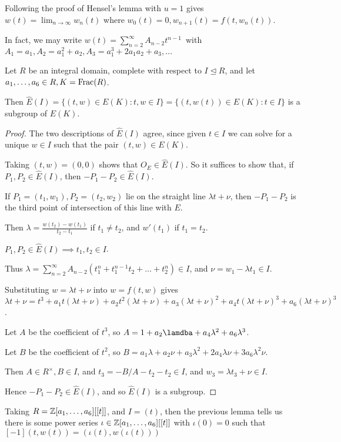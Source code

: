 \documentclass[10pt,a4paper]{article}
\begin{document}
Following the proof of Hensel's lemma with $u = 1$ gives $w(t) = \lim_{n\to \infty} w_n(t)$ where $w_0(t) = 0, w_{n+1}(t)=f(t, w_n(t))$.

In fact, we may write \mbox{$w(t) = \sum_{n=2}^\infty A_{n-2}t^{n-1}$ with $A_1 = a_1, A_2 = a_1^2+a_2, A_3 = a_1^3+2a_1a_2+a_3, \ldots$}

\begin{lemma}
  Let $R$ be an integral domain, complete with respect to $I \trianglelefteq R$, and let $a_1, \ldots, a_6 \in R, K = \operatorname{Frac}(R)$.

  Then $\hat{E}(I) = \{(t,w) \in E(K): t, w \in I\} = \{(t, w(t))\in E(K): t \in I\}$ is a subgroup of $E(K)$.
\end{lemma}
\begin{proof}
  The two descriptions of $\hat{E}(I)$ agree, since given $t \in I$ we can solve for a unique $w \in I$ such that the pair $(t,w)\in E(K)$.

  Taking $(t, w) = (0, 0)$ shows that $O_E \in \hat{E}(I)$. So it suffices to show that, if $P_1, P_2 \in \hat{E}(I)$, then $-P_1-P_2 \in \hat{E}(I)$.

  If $P_1 = (t_1,w_1), P_2 = (t_2,w_2)$ lie on the straight line $\lambda t + \nu$, then $-P_1-P_2$ is the third point of intersection of this line with $E$.

  Then $\lambda = \frac{w(t_2)-w(t_1)}{t_2-t_1}$ if $t_1 \neq t_2$, and $w'(t_1)$ if $t_1=t_2$.

  $P_1, P_2 \in \hat{E}(I) \implies t_1, t_2 \in I$.

  Thus $\lambda = \sum_{n=2}^\infty A_{n-2}(t_1^n + t_1^{n-1}t_2 + \ldots + t_2^n) \in I$, and $\nu = w_1-\lambda t_1 \in I$.

  Substituting $w = \lambda t + \nu$ into $w = f(t,w)$ gives $\lambda t+\nu = t^3 + a_1t(\lambda t+ \nu) + a_2t^2(\lambda t+\nu) + a_3(\lambda t+ \nu)^2 + a_4 t(\lambda t + \nu)^3 + a_6(\lambda t+\nu)^3$.

  Let $A$ be the coefficient of $t^3$, so $A = 1+a_2\lamdba+a_4 \lambda^2 + a_6\lambda^3$.

  Let $B$ be the coefficient of $t^2$, so $B = a_1\lambda + a_2\nu + a_3\lambda^2+2a_4\lambda\nu+3a_6\lambda^2\nu$.

  Then $A \in R^\times, B \in I$, and $t_3 = -B/A -t_2 -t_2 \in I$, and $w_3 = \lambda t_3 + \nu \in I$.

  Hence $-P_1-P_2 \in \hat{E}(I)$, and so $\hat{E}(I)$ is a subgroup.
\end{proof}
Taking $R = \mathbb{Z}[a_1, \ldots, a_6][[t]]$, and $I = (t)$, then the previous lemma tells us there is some power series $\iota \in \mathbb{Z}[a_1,\ldots, a_6][[t]]$ with $\iota(0) = 0$ such that $[-1](t, w(t)) = (\iota(t), w(\iota(t)))$
\end{document}

